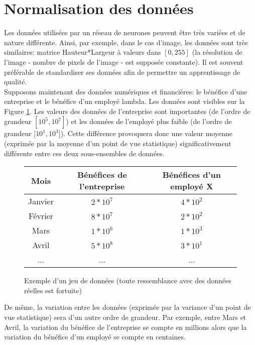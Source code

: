 \section{Normalisation des données}

Les données utilisées par un réseau de neurones peuvent être très variées et de nature différente. Ainsi, par exemple, dans le cas d'image, les données sont très similaires: matrice Hauteur*Largeur à valeurs dans $[0,255]$ (la résolution de l'image - nombre de pixels de l'image - est supposée constante). Il est souvent préférable de standardiser ses données afin de permettre un apprentissage de qualité.\\

\noindent Supposons maintenant des données numériques et financières: le bénéfice d'une entreprise et le bénéfice d'un employé lambda. Les données sont visibles sur la Figure \ref{dataset_entreprise}. Les valeurs des données de l'entreprise sont importantes (de l'ordre de grandeur $[10^5,10^{7}]$) et les données de l'employé plus faible (de l'ordre de grandeur $[10^1,10^3$]). Cette différence provoquera donc une valeur moyenne (exprimée par la moyenne d'un point de vue statistique) significativement différente entre ces deux sous-ensembles de données.\\

\begin{figure}
    \centering
    \begin{tabular}{|c|c|c|}
    \hline
        Mois & Bénéfices de l'entreprise & Bénéfices d'un employé X  \\
        \hline
        Janvier & $2*10^7$ & $4*10^2$\\
        Février & $8*10^7$ & $2*10^2$\\
        Mars & $1*10^6$ & $1*10^3$\\
        Avril & $5*10^8$ & $3*10^1$\\
        ... & ... & ...\\
        \hline
    \end{tabular}
    \caption{Exemple d'un jeu de données (toute ressemblance avec des données réelles est fortuite)}
    \label{dataset_entreprise}
\end{figure}

\noindent De même, la variation entre les données (exprimée par la variance d'un point de vue statistique) sera d'un autre ordre de grandeur. Par exemple, entre Mars et Avril, la variation du bénéfice de l'entreprise se compte en millions alors que la variation du bénéfice d'un employé se compte en centaines.\\

